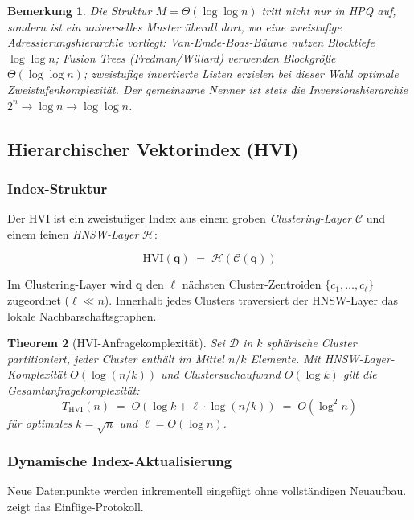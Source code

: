 ﻿\documentclass[12pt,a4paper]{article}
\newtheorem{theorem}{Theorem}[section]
\newtheorem{remark}[theorem]{Bemerkung}
\begin{document}
\begin{remark}
  Die Struktur $M = \Theta(\log\log n)$ tritt nicht nur in HPQ auf, 
  sondern ist ein universelles Muster überall dort, wo eine zweistufige 
  Adressierungshierarchie vorliegt: Van-Emde-Boas-Bäume nutzen 
  Blocktiefe $\log\log n$; Fusion Trees (Fredman/Willard) verwenden 
  Blockgröße $\Theta(\log\log n)$; zweistufige invertierte Listen 
  erzielen bei dieser Wahl optimale Zweistufenkomplexität. 
  Der gemeinsame Nenner ist stets die Inversionshierarchie 
  $2^n \to \log n \to \log\log n$.
\end{remark}

\subsection{Hierarchischer Vektorindex (HVI)}
\label{sec:hvi}

\subsubsection{Index-Struktur}

Der HVI ist ein zweistufiger Index aus einem groben 
\emph{Clustering-Layer} $\mathcal{C}$ und einem feinen 
\emph{HNSW-Layer} $\mathcal{H}$:

\[
  \text{HVI}(\mathbf{q}) \;=\; \mathcal{H}\!\left(
    \mathcal{C}(\mathbf{q})
  \right)
\]

Im Clustering-Layer wird $\mathbf{q}$ den $\ell$ nächsten 
Cluster-Zentroiden $\{c_1,\ldots,c_\ell\}$ zugeordnet ($\ell \ll n$). 
Innerhalb jedes Clusters traversiert der HNSW-Layer das lokale 
Nachbarschaftsgraphen.

\begin{theorem}[HVI-Anfragekomplexität]
\label{thm:complexity}
Sei $\mathcal{D}$ in $k$ sphärische Cluster partitioniert, 
jeder Cluster enthält im Mittel $n/k$ Elemente. Mit HNSW-Layer-Komplexität 
$O(\log(n/k))$ und Clustersuchaufwand $O(\log k)$ gilt die 
Gesamtanfragekomplexität:
\[
  T_{\text{HVI}}(n) \;=\; O\!\left(\log k + \ell \cdot \log(n/k)\right)
  \;=\; O\!\left(\log^2 n\right)
\]
für optimales $k = \sqrt{n}$ und $\ell = O(\log n)$.
\end{theorem}

\subsubsection{Dynamische Index-Aktualisierung}

Neue Datenpunkte werden inkrementell eingefügt ohne vollständigen 
Neuaufbau.  zeigt das Einfüge-Protokoll.
\end{document}
